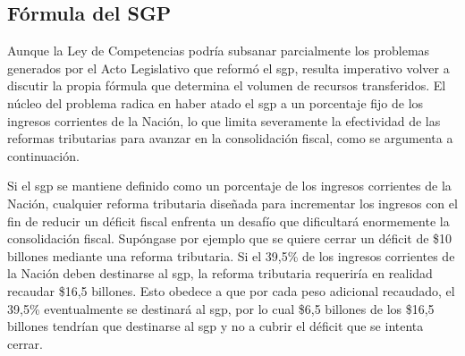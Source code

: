 



\subsection{Fórmula del SGP}

Aunque la Ley de Competencias podría subsanar parcialmente los problemas generados por el Acto Legislativo que reformó el \gls{sgp}, resulta imperativo volver a discutir la propia fórmula que determina el volumen de recursos transferidos. El núcleo del problema radica en haber atado el \gls{sgp} a un porcentaje fijo de los ingresos corrientes de la Nación, lo que limita severamente la efectividad de las reformas tributarias para avanzar en la consolidación fiscal, como se argumenta a continuación.

Si el \gls{sgp} se mantiene definido como un porcentaje de los ingresos corrientes de la Nación, cualquier reforma tributaria diseñada para incrementar los ingresos con el fin de reducir un déficit fiscal enfrenta un desafío que dificultará enormemente la consolidación fiscal. Supóngase por ejemplo que se quiere cerrar un déficit de \$10 billones mediante una reforma tributaria. Si el 39,5\% de los ingresos corrientes de la Nación deben destinarse al \gls{sgp}, la reforma tributaria requeriría en realidad recaudar \$16,5 billones. Esto obedece a que por cada peso adicional recaudado, el 39,5\% eventualmente se destinará al \gls{sgp}, por lo cual \$6,5 billones de los \$16,5 billones tendrían que destinarse al \gls{sgp} y no a cubrir el déficit que se intenta cerrar. 

